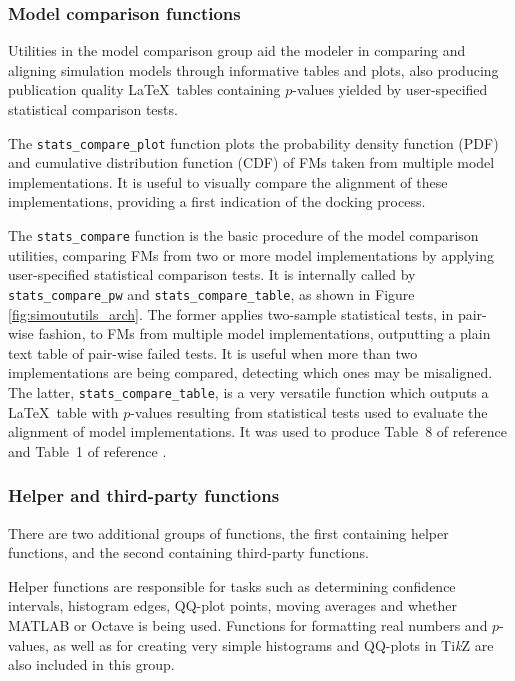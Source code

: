 \documentclass{article}
\newcommand{\progfunc}{\textnhtt}
\newcommand{\TikZ}{Ti\textit{k}Z\xspace}
\begin{document}
\subsubsection*{Model comparison functions}

Utilities in the model comparison group aid the modeler in comparing and aligning simulation models through informative tables and plots, also producing publication quality \LaTeX\ tables containing $p$-values yielded by user-specified statistical comparison tests.

The \progfunc{stats\_compare\_plot} function plots the probability density function (PDF) and cumulative distribution function (CDF) of FMs taken from multiple model implementations. It is useful to visually compare the alignment of these implementations, providing a first indication of the docking process.

The \progfunc{stats\_compare} function is the basic procedure of the model comparison utilities, comparing FMs from two or more model implementations by applying user-specified statistical comparison tests. It is internally called by \progfunc{stats\_compare\_pw} and \progfunc{stats\_compare\_table}, as shown in Figure \ref{fig:simoututils_arch}. The former applies two-sample statistical tests, in pair-wise fashion, to FMs  from multiple model implementations, outputting a plain text table of pair-wise failed tests. It is useful when more than two implementations are being compared, detecting which ones may be misaligned. The latter, \progfunc{stats\_compare\_table}, is a very versatile function which outputs a \LaTeX\ table with $p$-values resulting from statistical tests used to evaluate the alignment of model implementations. It was used to produce Table~8 of reference \cite{fachada2015parallelization} and Table~1 of reference \cite{fachada2015model}.

\subsubsection*{Helper and third-party functions}

There are two additional groups of functions, the first containing helper functions, and the second containing third-party functions.

Helper functions are responsible for tasks such as determining confidence intervals, histogram edges, QQ-plot points, moving averages and whether MATLAB or Octave is being used. Functions for formatting real numbers and $p$-values, as well as for creating very simple histograms and QQ-plots in \TikZ \cite{tantau2013tikz} are also included in this group.
\end{document}
